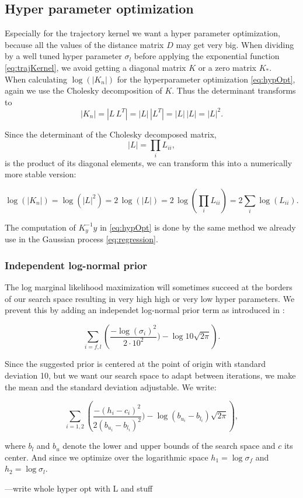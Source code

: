 \subsection{Hyper parameter optimization}

Especially for the trajectory kernel we want a hyper parameter optimization, because all the values of the distance matrix $D$ may get very big. When dividing by a well tuned hyper parameter $\sigma_l$ before applying the exponential function \eqref{eq:trajKernel}, we avoid getting a diagonal matrix $K$ or a zero matrix $K_*$.\\

When calculating $\log(|K_n|)$ for the hyperparameter optimization \eqref{eq:hypOpt}, again we use the Cholesky decomposition of $K$. Thus the determinant transforms to
$$|K_n|=|L\,L^{T}|=|L|\,|L^{T}|=|L|\,|L|=|L|^{2}.$$

Since the determinant of the Cholesky decomposed matrix,
$$|L| = \textstyle\prod_{i} L_{ii},$$
is the product of its diagonal elements, we can transform this into a numerically more stable version:

$$\log(|K_n|) = \log(|L|^{2}) = 2\,\log(|L|) = 2\,\log(\textstyle\prod_{i} L_{ii}) = 2\textstyle\sum_{i} \log(L_{ii}).$$

The computation of $K_y^{-1}y$ in \eqref{eq:hypOpt} is done by the same method we already use in the Gaussian process \eqref{eq:regression}.

\subsubsection{Independent log-normal prior}
The log marginal likelihood maximization will sometimes succeed at the borders of our search space resulting in very high high or very low hyper parameters. We prevent this by adding an independet log-normal prior term as introduced in \cite{lizotte2008practical}:

$$\sum_{i=f,l}\left(\frac{-\log(\sigma_i)^2}{2\cdot 10^2}) - \log 10\sqrt{2\pi} \right).$$

Since the suggested prior is centered at the point of origin with standard deviation 10, but we want our search space to adapt between iterations, we make the mean and the standard deviation adjustable. We write:

$$\sum_{i=1,2}\left(\frac{-(h_i-c_i)^2}{2(b_{u_i}-b_{l_i})^2}) - \log(b_{u_i}-b_{l_i})\sqrt{2\pi} \right),$$

where $b_l$ and $b_u$ denote the lower and upper bounds of the search space and $c$ its center. And since we optimize over the logarithmic space $h_1 = \log\sigma_f$ and $h_2 = \log\sigma_l$.


---write whole hyper opt with L and stuff
